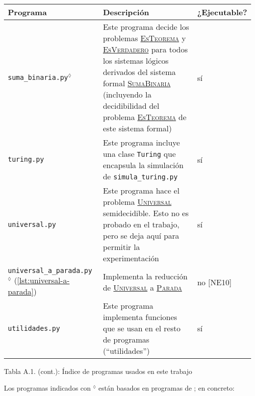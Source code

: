 \newpage

\vspace*{0.9cm}

\begin{tabularx}{\textwidth}{L{0.3} L{0.5} L{0.2}}
\midrule
Programa & Descripción & ¿Ejecutable? \\
\midrule
\texttt{suma\_binaria.py}$^\lozenge$ & Este programa decide los problemas \hyperref[prob:es-teorema]{\textsc{EsTeorema}} y \hyperref[prob:es-verdadero]{\textsc{EsVerdadero}} para todos los sistemas lógicos derivados del sistema formal \hyperref[sf:suma-binaria]{\textsc{SumaBinaria}} (incluyendo la decidibilidad del problema \hyperref[prob:es-teorema]{\textsc{EsTeorema}} de este sistema formal) \vspace{4pt} & sí \\

\texttt{turing.py} & Este programa incluye una clase \texttt{Turing} que encapsula la simulación de \texttt{simula\_turing.py} \vspace{4pt} & sí \\

\texttt{universal.py} & Este programa hace el problema \hyperref[prob:universal]{\textsc{Universal}} semidecidible. Esto no es probado en el trabajo, pero se deja aquí para permitir la experimentación \vspace{4pt} & sí \\

\texttt{universal\_a\_parada.py}$^\lozenge$ \linebreak \small{(\cref{lst:universal-a-parada})} & Implementa la reducción de \hyperref[prob:universal]{\textsc{Universal}} a \hyperref[prob:parada]{\textsc{Parada}} \vspace{4pt} & no [NE10] \\

\texttt{utilidades.py} & Este programa implementa funciones que se usan en el resto de programas (``utilidades'') \vspace{2pt} & sí \\

\midrule
\end{tabularx}
\vspace*{-0.2cm}
\begin{tabla}
\caption*{Tabla A.1. (cont.): Índice de programas usados en este trabajo}
\label{tab:indice-programas}
\end{tabla}

Los programas indicados con $^\lozenge$ están basados en programas de \cite{MacCormick2018}; en concreto:

